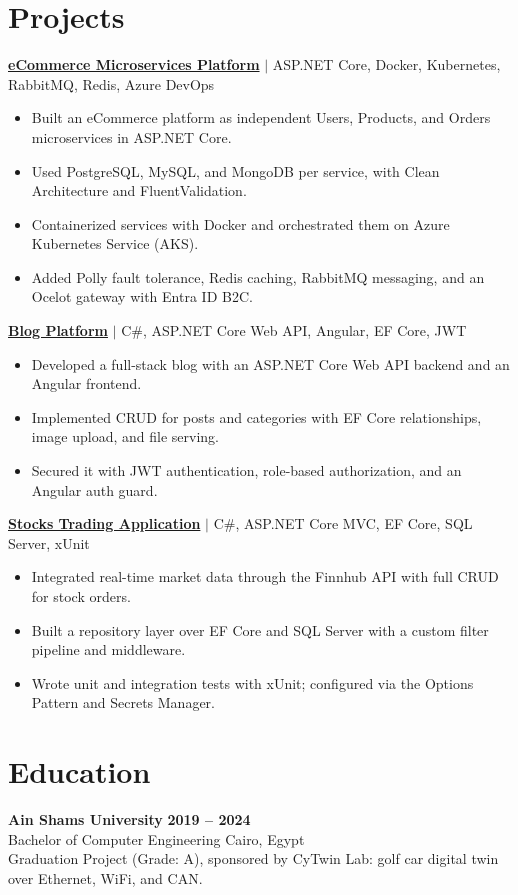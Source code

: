 \documentclass[letterpaper,11pt]{article}
\begin{document}
\section{Projects}

\textbf{\href{https://github.com/markkashraf/eCommerceWithMicroservices}{eCommerce Microservices Platform}} $\vert$ ASP.NET Core, Docker, Kubernetes, RabbitMQ, Redis, Azure DevOps
\begin{itemize}
  \item Built an eCommerce platform as independent Users, Products, and Orders microservices in ASP.NET Core.
  \item Used PostgreSQL, MySQL, and MongoDB per service, with Clean Architecture and FluentValidation.
  \item Containerized services with Docker and orchestrated them on Azure Kubernetes Service (AKS).
  \item Added Polly fault tolerance, Redis caching, RabbitMQ messaging, and an Ocelot gateway with Entra ID B2C.
\end{itemize}

\vspace{4pt}
\textbf{\href{https://github.com/markkashraf/Blog}{Blog Platform}} $\vert$ C\#, ASP.NET Core Web API, Angular, EF Core, JWT
\begin{itemize}
  \item Developed a full-stack blog with an ASP.NET Core Web API backend and an Angular frontend.
  \item Implemented CRUD for posts and categories with EF Core relationships, image upload, and file serving.
  \item Secured it with JWT authentication, role-based authorization, and an Angular auth guard.
\end{itemize}

\vspace{4pt}
\textbf{\href{https://github.com/markkashraf/StocksAppProject}{Stocks Trading Application}} $\vert$ C\#, ASP.NET Core MVC, EF Core, SQL Server, xUnit
\begin{itemize}
  \item Integrated real-time market data through the Finnhub API with full CRUD for stock orders.
  \item Built a repository layer over EF Core and SQL Server with a custom filter pipeline and middleware.
  \item Wrote unit and integration tests with xUnit; configured via the Options Pattern and Secrets Manager.
\end{itemize}

\section{Education}
\textbf{Ain Shams University} \hfill \textbf{2019 -- 2024}\\
Bachelor of Computer Engineering \hfill Cairo, Egypt\\
Graduation Project (Grade: A), sponsored by CyTwin Lab: golf car digital twin over Ethernet, WiFi, and CAN.
\end{document}
